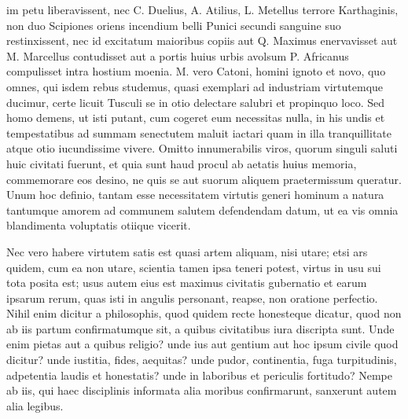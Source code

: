 
 im petu liberavissent, nec C. Duelius, A. Atilius, L. Metellus terrore Karthaginis, non duo Scipiones oriens incendium belli Punici secundi sanguine suo restinxissent, nec id excitatum maioribus copiis aut Q. Maximus enervavisset aut M. Marcellus contudisset aut a portis huius urbis avolsum P. Africanus compulisset intra hostium moenia. M. vero Catoni, homini ignoto et novo, quo omnes, qui isdem rebus studemus, quasi exemplari ad industriam virtutemque ducimur, certe licuit Tusculi se in otio delectare salubri et propinquo loco. Sed homo demens, ut isti putant, cum cogeret eum necessitas nulla, in his undis et tempestatibus ad summam senectutem maluit iactari quam in illa tranquillitate atque otio iucundissime vivere. Omitto innumerabilis viros, quorum singuli saluti huic civitati fuerunt, et quia sunt haud procul ab aetatis huius memoria, commemorare eos desino, ne quis se aut suorum aliquem praetermissum queratur. Unum hoc definio, tantam esse necessitatem virtutis generi hominum a natura tantumque amorem ad communem salutem defendendam datum, ut ea vis omnia blandimenta voluptatis otiique vicerit.

 Nec vero habere virtutem satis est quasi artem aliquam, nisi utare; etsi ars quidem, cum ea non utare, scientia tamen ipsa teneri potest, virtus in usu sui tota posita est; usus autem eius est maximus civitatis gubernatio et earum ipsarum rerum, quas isti in angulis personant, reapse, non oratione perfectio. Nihil enim dicitur a philosophis, quod quidem recte honesteque dicatur, quod non ab iis partum confirmatumque sit, a quibus civitatibus iura discripta sunt. Unde enim pietas aut a quibus religio? unde ius aut gentium aut hoc ipsum civile quod dicitur? unde iustitia, fides, aequitas? unde pudor, continentia, fuga turpitudinis, adpetentia laudis et honestatis? unde in laboribus et periculis fortitudo? Nempe ab iis, qui haec disciplinis informata alia moribus confirmarunt, sanxerunt autem alia legibus.

